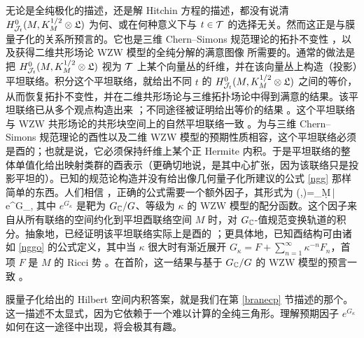 无论是全纯极化的描述，还是解 Hitchin 方程的描述，都没有说清 $H^0_{{\mathcal J}_t}(M,K_M^{1/2}\otimes{\mathfrak L})$ 为何、或在何种意义下与 $t\in{\mathcal T}$ 的选择无关。然而这正是与膜量子化的关系所预言的。它也是三维 Chern--Simons 规范理论的拓扑不变性 \cite{WittenJ}，以及获得二维共形场论 WZW 模型的全纯分解的满意图像 \cite{KZ} 所需要的。通常的做法是把 $H^0_{{\mathcal J}_t}(M,K_M^{1/2}\otimes{\mathfrak L})$ 视为 ${\mathcal T}$ 上某个向量丛的纤维，并在该向量丛上构造（投影）平坦联络。积分这个平坦联络，就给出不同 $t$ 的 $H^0_{{\mathcal J}_t}(M,K_M^{1/2}\otimes{\mathfrak L})$ 之间的等价，从而恢复拓扑不变性，并在二维共形场论与三维拓扑场论中得到满意的结果。该平坦联络已从多个观点构造出来 \cite{ADW,Hitchtwo,Faltings}；不同途径被证明给出等价的结果 \cite{And}。这个平坦联络与 WZW 共形场论的共形块空间上的自然平坦联络一致 \cite{Las}。为与三维 Chern--Simons 规范理论的酉性以及二维 WZW 模型的预期性质相容，这个平坦联络必须是酉的；也就是说，它必须保持纤维上某个正 Hermite 内积。于是平坦联络的整体单值化给出映射类群的酉表示（更确切地说，是其中心扩张，因为该联络只是投影平坦的）。已知的规范论构造并没有给出像几何量子化所建议的公式 \eqref{ngg} 那样简单的东西。人们相信 \cite{El,Gaw,Gaw2}，正确的公式需要一个额外因子，其形式为
\be\label{nggo}(\psi,\chi)=\int_M\d\mu\,\bar\psi\chi\,e^{G_\kappa},\ee
其中 $e^{G_\kappa}$ 是靶为 $G_{\mathbb C}/G$、等级为 $\kappa$ 的 WZW 模型的配分函数。这个因子来自从所有联络的空间约化到平坦酉联络空间 $M$ 时，对 $G_{\mathbb C}$-值规范变换轨道的积分。抽象地，已经证明该平坦联络实际上是酉的 \cite{And2}；更具体地，已知酉结构可由诸如 \eqref{nggo} 的公式定义，其中当 $\kappa$ 很大时有渐近展开 $G_\kappa=F+\sum_{n=1}^\infty\kappa^{-n}F_n$，首项 $F$ 是 $M$ 的 Ricci 势 \cite{And3}。在首阶，这一结果与基于 $G_{\mathbb C}/G$ 的 WZW 模型的预言一致 \cite{And4}。

膜量子化给出的 Hilbert 空间内积答案，就是我们在第 \ref{branecp} 节描述的那个。这一描述不太显式，因为它依赖于一个难以计算的全纯三角形。理解预期因子 $e^{G_\kappa}$ 如何在这一途径中出现，将会极其有趣。
